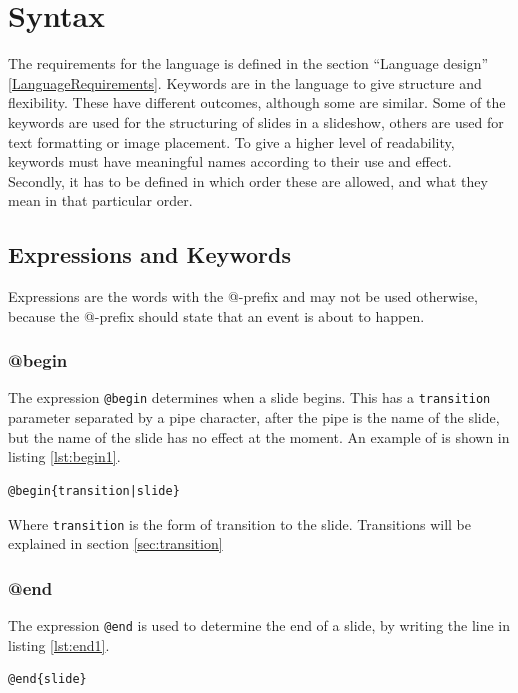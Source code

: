 \chapter{Syntax}
\label{SSyntax}

The requirements for the language is defined in the section ``Language design'' \ref{LanguageRequirements}. Keywords are in the language to give structure and flexibility. These have different outcomes, although some are similar. Some of the keywords are used for the structuring of slides in a slideshow, others are used for text formatting or image placement. To give a higher level of readability, keywords must have meaningful names according to their use and effect. Secondly, it has to be defined in which order these are allowed, and what they mean in that particular order.

\section{Expressions and Keywords}
Expressions are the words with the @-prefix and may not be used otherwise, because the @-prefix should state that an event is about to happen.

\subsection{@begin}
\label{@begin}
The expression \texttt{@begin} determines when a slide begins. This has a \texttt{transition} parameter separated by a pipe character, after the pipe is the name of the slide, but the name of the slide has no effect at the moment. An example of is shown in listing \ref{lst:begin1}.
\begin{lstlisting}[frame=single, caption=begin expression generic, label=lst:begin1]
@begin{transition|slide}
\end{lstlisting}
Where \texttt{transition} is the form of transition to the slide. Transitions will be explained in section \ref{sec:transition}

\subsection{@end}
\label{@end}
The expression \texttt{@end} is used to determine the end of a slide, by writing the line in listing \ref{lst:end1}.
\begin{lstlisting}[frame=single, caption=end expression generic, label=lst:end1]
@end{slide}
\end{lstlisting}

